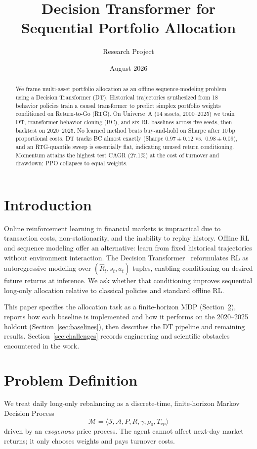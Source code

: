 \documentclass[11pt]{article}
\title{Decision Transformer for Sequential Portfolio Allocation}
\author{Research Project}
\date{August 2026}
\begin{document}
\maketitle

\begin{abstract}
We frame multi-asset portfolio allocation as an offline sequence-modeling problem using a Decision Transformer (DT). Historical trajectories synthesized from 18 behavior policies train a causal transformer to predict simplex portfolio weights conditioned on Return-to-Go (RTG). On Universe~A (14 assets, 2000--2025) we train DT, transformer behavior cloning (BC), and six RL baselines across five seeds, then backtest on 2020--2025. No learned method beats buy-and-hold on Sharpe after 10\,bp proportional costs. DT tracks BC almost exactly (Sharpe $0.97\pm0.12$ vs.\ $0.98\pm0.09$), and an RTG-quantile sweep is essentially flat, indicating unused return conditioning. Momentum attains the highest test CAGR (27.1\%) at the cost of turnover and drawdown; PPO collapses to equal weights.
\end{abstract}

\section{Introduction}
Online reinforcement learning in financial markets is impractical due to transaction costs, non-stationarity, and the inability to replay history. Offline RL and sequence modeling offer an alternative: learn from fixed historical trajectories without environment interaction. The Decision Transformer~\cite{chen2021dt} reformulates RL as autoregressive modeling over $(\hat{R}_t, s_t, a_t)$ tuples, enabling conditioning on desired future returns at inference. We ask whether that conditioning improves sequential long-only allocation relative to classical policies and standard offline RL.

This paper specifies the allocation task as a finite-horizon MDP (Section~\ref{sec:mdp}), reports how each baseline is implemented and how it performs on the 2020--2025 holdout (Section~\ref{sec:baselines}), then describes the DT pipeline and remaining results. Section~\ref{sec:challenges} records engineering and scientific obstacles encountered in the work.

\section{Problem Definition}
\label{sec:mdp}
We treat daily long-only rebalancing as a discrete-time, finite-horizon Markov Decision Process
\[
\mathcal{M} = \langle \mathcal{S}, \mathcal{A}, P, R, \gamma, \rho_0, T_{\mathrm{ep}} \rangle
\]
driven by an \emph{exogenous} price process. The agent cannot affect next-day market returns; it only chooses weights and pays turnover costs.
\end{document}
